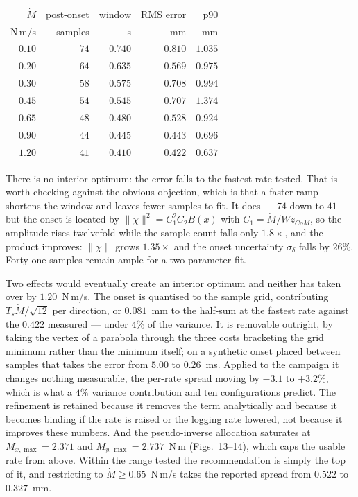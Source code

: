 \documentclass[10pt]{article}
\newcommand{\Mdot}{\dot M}
\begin{document}
\begin{center}\small
\begin{tabular}{@{}rrrrr@{}}
\toprule
$\Mdot$ & post-onset & window & RMS error & p90 \\
N\,m/s & samples & s & mm & mm \\
\midrule
$0.10$ & $74$ & $0.740$ & $0.810$ & $1.035$ \\
$0.20$ & $64$ & $0.635$ & $0.569$ & $0.975$ \\
$0.30$ & $58$ & $0.575$ & $0.708$ & $0.994$ \\
$0.45$ & $54$ & $0.545$ & $0.707$ & $1.374$ \\
$0.65$ & $48$ & $0.480$ & $0.528$ & $0.924$ \\
$0.90$ & $44$ & $0.445$ & $0.443$ & $0.696$ \\
$1.20$ & $41$ & $0.410$ & $\mathbf{0.422}$ & $\mathbf{0.637}$ \\
\bottomrule
\end{tabular}
\end{center}

There is no interior optimum: the error falls to the fastest rate
tested. That is worth checking against the obvious objection, which is
that a faster ramp shortens the window and leaves fewer samples to fit.
It does --- $74$ down to $41$ --- but the onset is located by
$\|\chi\|^2 = C_1^2C_2B(x)$ with $C_1 = \Mdot/W\!z_{CoM}$, so the
amplitude rises twelvefold while the sample count falls only $1.8\times$,
and the product improves: $\|\chi\|$ grows $1.35\times$ and the onset
uncertainty $\sigma_\delta$ falls by $26\%$. Forty-one samples remain
ample for a two-parameter fit.

Two effects would eventually create an interior optimum and neither has
taken over by $1.20$~N\,m/s. The onset is quantised to the sample grid,
contributing $T_s\Mdot/\sqrt{12}$ per direction, or $0.081$~mm to the
half-sum at the fastest rate against the $0.422$ measured --- under
$4\%$ of the variance. It is removable outright, by taking the vertex of
a parabola through the three costs bracketing the grid minimum rather
than the minimum itself; on a synthetic onset placed between samples
that takes the error from $5.00$ to $0.26$~ms. Applied to the campaign
it changes nothing measurable, the per-rate spread moving by $-3.1$ to
$+3.2\%$, which is what a $4\%$ variance contribution and ten
configurations predict. The refinement is retained because it removes
the term analytically and because it becomes binding if the rate is
raised or the logging rate lowered, not because it improves these
numbers. And the pseudo-inverse allocation saturates at
$M_{x,\max} = 2.371$ and $M_{y,\max} = 2.737$~N\,m (Figs.~13--14),
which caps the usable rate from above. Within the range tested the
recommendation is simply the top of it, and restricting to
$\Mdot\ge0.65$~N\,m/s takes the reported spread from $0.522$ to
$0.327$~mm.
\end{document}
